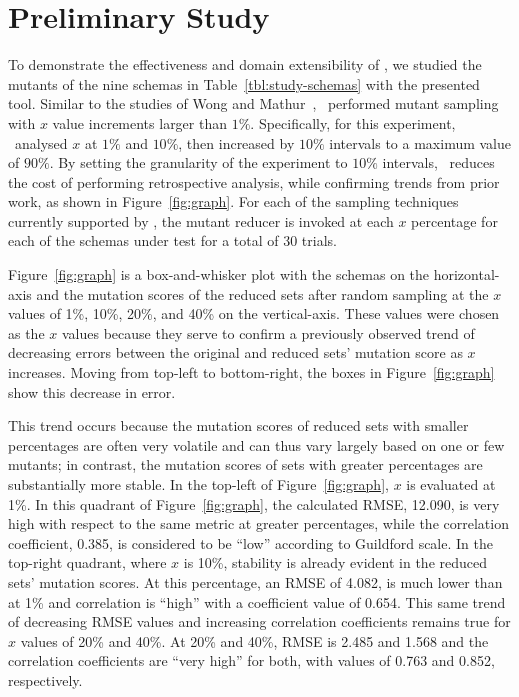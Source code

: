 \vspace*{-.25em}

\section{Preliminary Study}


To demonstrate the effectiveness and domain extensibility of \mrstudyr, we studied the mutants of the nine schemas in
Table~\ref{tbl:study-schemas} with the presented tool. Similar to the studies of Wong and
Mathur~\cite{mathur1994empirical}, \mr~performed mutant sampling with $x$ value increments larger than $1\%$.
Specifically, for this experiment, \mr~analysed $x$ at $1\%$ and $10\%$, then increased by $10\%$ intervals to a maximum
value of $90\%$. By setting the granularity of the experiment to $10\%$ intervals, \mr~reduces the cost of performing
retrospective analysis, while confirming trends from prior work, as shown in Figure~\ref{fig:graph}. For each of the
sampling techniques currently supported by \mr, the mutant reducer is invoked at each $x$ percentage for each of the
schemas under test for a total of 30 trials.


Figure~\ref{fig:graph} is a box-and-whisker plot with the schemas on the horizontal-axis and the mutation scores of the reduced
sets after random sampling at the $x$ values of 1\%, 10\%, 20\%, and 40\% on the vertical-axis.  These values were chosen as the
$x$ values because they serve to confirm a previously observed trend of decreasing errors between the original and reduced sets'
mutation score as $x$ increases. Moving from top-left to bottom-right, the boxes in Figure~\ref{fig:graph} show this decrease in
error.



This trend occurs because the mutation scores of reduced sets with smaller percentages are often very volatile and can
thus vary largely based on one or few mutants; in contrast, the mutation scores of sets with greater percentages are
substantially more stable. In the top-left of Figure~\ref{fig:graph}, $x$ is evaluated at 1\%. In this quadrant of
Figure~\ref{fig:graph}, the calculated RMSE, 12.090, is very high with respect to the same metric at greater
percentages, while the correlation coefficient, 0.385, is considered to be ``low'' according to Guildford scale. In
the top-right quadrant, where $x$ is 10\%, stability is already evident in the reduced sets' mutation scores. At this
percentage, an RMSE of 4.082, is much lower than at 1\% and correlation is ``high'' with a coefficient value of 0.654.
This same trend of decreasing RMSE values and increasing correlation coefficients remains true for $x$ values of 20\%
and 40\%. At 20\% and 40\%, RMSE is 2.485 and 1.568 and the correlation coefficients are ``very high'' for both,
with values of 0.763 and 0.852, respectively.

